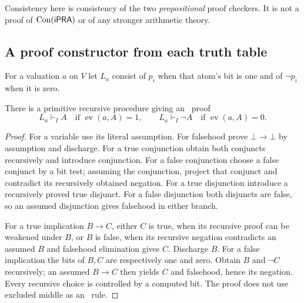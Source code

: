 Consistency here is consistency of the two \emph{propositional} proof
checkers. It is not a proof of $\operatorname{Con}(\mathsf{iPRA})$ or of any stronger
arithmetic theory.

\subsection{A proof constructor from each truth table}

For a valuation $a$ on $V$ let $L_a$ consist of $p_i$ when that atom's bit is
one and of $\neg p_i$ when it is zero.

\begin{lemma}\label{thm:signed-eval}
There is a primitive recursive procedure giving an \IPC\ proof
\[
 L_a\vdash_I A\quad\text{if }\operatorname{ev}(a,A)=1,
 \qquad
 L_a\vdash_I\neg A\quad\text{if }\operatorname{ev}(a,A)=0.
\]
\end{lemma}
\begin{proof}
For a variable use its literal assumption. For falsehood prove
$\bot\to\bot$ by assumption and discharge. For a true conjunction obtain
both conjuncts recursively and introduce conjunction. For a false
conjunction choose a false conjunct by a bit test; assuming the conjunction,
project that conjunct and contradict its recursively obtained negation.
For a true disjunction introduce a recursively proved true disjunct. For a
false disjunction both disjuncts are false, so an assumed disjunction gives
falsehood in either branch.

For a true implication $B\to C$, either $C$ is true, when its recursive
proof can be weakened under $B$, or $B$ is false, when its recursive
negation contradicts an assumed $B$ and falsehood elimination gives $C$.
Discharge $B$. For a false implication the bits of $B,C$ are respectively
one and zero. Obtain $B$ and $\neg C$ recursively; an assumed $B\to C$
then yields $C$ and falsehood, hence its negation. Every recursive choice
is controlled by a computed bit. The proof does not use excluded middle
as an \IPC\ rule.
\end{proof}

